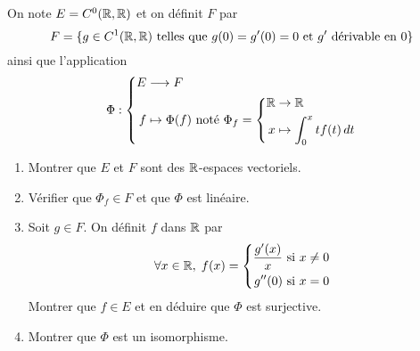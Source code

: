 On note $E=C^0(\mathbb{R},\mathbb{R})$ et on définit $F$ par
\begin{displaymath}
F=\{g\in C^1(\mathbb{R},\mathbb{R}) \text{ telles que } g(0)=g'(0)=0\text{ et } g' \text{ d{\'e}rivable en 0} \} 
\end{displaymath}
ainsi que l'application
\begin{displaymath}
 \Phi : \left\lbrace 
\begin{aligned}
 E &\longrightarrow F \\
 f & \mapsto \Phi(f) \text{ noté }\Phi_f 
 =
 \left\lbrace 
 \begin{aligned}
 \mathbb{R} &\rightarrow \mathbb{R} \\ x &\mapsto \int_0^x tf(t) \, dt
 \end{aligned}
 \right. 
\end{aligned}
\right. 
\end{displaymath}
\begin{enumerate}
    \item Montrer que $E$ et $F$ sont des $\mathbb{R}$-espaces vectoriels.
    \item V{\'e}rifier que $\Phi_f \in F$ et que $\Phi$ est lin{\'e}aire.
    \item Soit $g \in F$. On d{\'e}finit $f$ dans $\mathbb{R}$ par 
\begin{displaymath}
\forall x\in \mathbb{R},\; f(x)= \left\lbrace 
\begin{aligned}
 \frac{g'(x)}{x} &\text{ si } x\neq 0 \\
 g''(0) &\text{ si } x= 0 
\end{aligned}
\right. 
\end{displaymath}
      Montrer que $f\in E$ et en d{\'e}duire que $\Phi$ est surjective.
    \item Montrer que $\Phi$ est un isomorphisme.
\end{enumerate}
